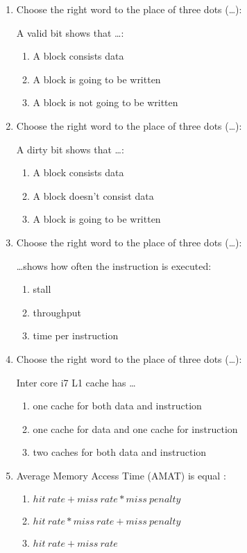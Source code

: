 \documentclass[paper=8.2in:11.6in]{scrartcl}
\begin{document}
\begin{enumerate}
\begin{enumerate}[label=\alph*)]
\end{enumerate}

\item Choose the right word to the place of three dots (\ldots):

A valid bit shows that \ldots:
\begin{enumerate}[label=\alph*)]
\item A block consists data
\item A block is going to be written
\item A block is not going to be written
\end{enumerate}

\item Choose the right word to the place of three dots (\ldots):

A dirty bit shows that \ldots:
\begin{enumerate}[label=\alph*)]
\item A block consists data
\item A block doesn’t consist data
\item A block is going to be written
\end{enumerate}

\item Choose the right word to the place of three dots (\ldots):

\ldots shows how often the instruction is executed:
\begin{enumerate}[label=\alph*)]
\item stall
\item throughput
\item time per instruction
\end{enumerate}

\item Choose the right word to the place of three dots (\ldots):

Inter core i7 L1 cache has \ldots

\begin{enumerate}[label=\alph*)]
\item one cache for both data and instruction
\item one cache for data and one cache for instruction
\item two caches for both data and instruction
\end{enumerate}

\item Average Memory Access Time (AMAT) is equal :
\begin{enumerate}[label=\alph*)]
\item $ hit \ rate + miss \ rate * miss \ penalty $
\item $ hit \ rate * miss \ rate + miss \ penalty $
\item $ hit \ rate + miss \ rate$
\end{enumerate}


\end{enumerate}
\end{document}
